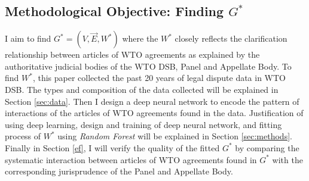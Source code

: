 \subsection{Methodological Objective: Finding $G^*$} \label{subsec:obj}
I aim to find $G^* = (V, \vec{E}, W^*)$ where the $W^*$ closely reflects the clarification relationship between articles of WTO agreements as explained by the authoritative judicial bodies of the WTO DSB, Panel and Appellate Body. To find $W^*$, this paper collected the past 20 years of legal dispute data in WTO DSB. The types and composition of the data collected will be explained in Section \ref{sec:data}.
Then I design a deep neural network to encode the pattern of interactions of the articles of WTO agreements found in the data. Justification of using deep learning, design and training of deep neural network, and fitting process of $W^*$ using \textit{Random Forest} will be explained in Section \ref{sec:methods}.
Finally in Section \ref{ef}, I will verify the quality of the fitted $G^*$ by comparing the systematic interaction between articles of WTO agreements found in $G^*$ with the corresponding jurisprudence of the Panel and Appellate Body.







